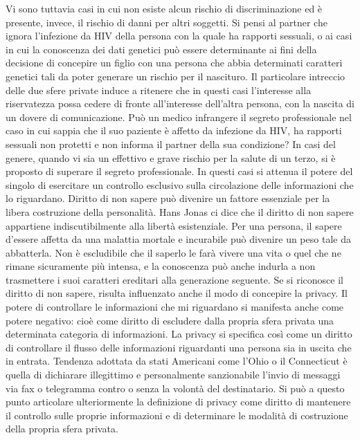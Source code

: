 Vi sono tuttavia casi in cui non esiste alcun rischio di discriminazione ed è presente, invece, il rischio di danni per altri soggetti. Si pensi al partner che ignora l’infezione da HIV della persona con la quale ha rapporti sessuali, o ai casi in cui la conoscenza dei dati genetici può essere determinante ai fini della decisione di concepire un figlio con una persona che abbia determinati caratteri genetici tali da poter generare un rischio per il nascituro. Il particolare intreccio delle due sfere private induce a ritenere che in questi casi l’interesse alla riservatezza possa cedere di fronte all’interesse dell’altra persona, con la nascita di un dovere di comunicazione.
Può un medico infrangere il segreto professionale nel caso in cui sappia che il suo paziente è affetto da infezione da HIV, ha rapporti sessuali non protetti e non informa il partner della sua condizione? In casi del genere, quando vi sia un effettivo e grave rischio per la salute di un terzo, si è proposto di superare il segreto professionale. In questi casi si attenua il potere del singolo di esercitare un controllo esclusivo sulla circolazione delle informazioni che lo riguardano.
Diritto di non sapere può divenire un fattore essenziale per la libera costruzione della personalità.
Hans Jonas ci dice che il diritto di non sapere appartiene indiscutibilmente alla libertà esistenziale. Per una persona, il sapere d’essere affetta da una malattia mortale e incurabile può divenire un peso tale da abbatterla. Non è escludibile che il saperlo le farà vivere una vita o quel che ne rimane sicuramente più intensa, e la conoscenza può anche indurla a non trasmettere i suoi caratteri ereditari alla generazione seguente.
Se si riconosce il diritto di non sapere, risulta influenzato anche il modo di concepire la privacy. Il potere di controllare le informazioni che mi riguardano si manifesta anche come potere negativo: cioè come diritto di escludere dalla propria sfera privata una determinata categoria di informazioni. La privacy si specifica così come un diritto di controllare il flusso delle informazioni riguardanti una persona sia in uscita che in entrata. Tendenza adottata da stati Americani come l’Ohio o il Connecticut è quella di dichiarare illegittimo e personalmente sanzionabile l’invio di messaggi via fax o telegramma contro o senza la volontà del destinatario.
Si può a questo punto articolare  ulteriormente la definizione di privacy come diritto di mantenere il controllo sulle proprie informazioni e di determinare le modalità di costruzione della propria sfera privata.


